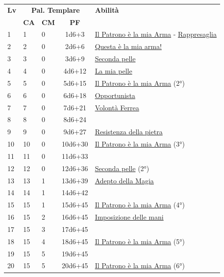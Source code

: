 {\begin{multicols}{2}


\noindent\begin{tabularx}{\linewidth}{p{0.3cm}|p{0.3cm}p{0.3cm}c|X|}
	\toprule
 \rowcolor{gray!20}	\textbf{Lv} & \multicolumn{3}{c|}{\textbf{Pal. Templare}} & \textbf{Abilità} \\
& \centering\arraybackslash \textbf{CA} & \centering\arraybackslash \textbf{CM} & \centering\arraybackslash \textbf{PF} & \\
	\toprule
	1 &1	& 0	&	1d6+3	&\hyperlink{Il Patrono è la mia Arma}{Il Patrono è la mia Arma} - \hyperlink{Rappresaglia}{Rappresaglia}\\
 \rowcolor{gray!20}2	&	2	& 0	&	2d6+6	&\hyperlink{Questa è la mia arma!}{Questa è la mia arma!}\\
	3	&	3	& 0	&	3d6+9	&\hyperlink{Seconda pelle}{Seconda pelle}\\
 \rowcolor{gray!20}4	&	4	& 0	&	4d6+12	&\hyperlink{La mia pelle}{La mia pelle}\\
	5	&	5	& 0	&	5d6+15	&\hyperlink{Il Patrono è la mia Arma}{Il Patrono è la mia Arma} (2°)\\
 \rowcolor{gray!20}6	&	6	& 0	&	6d6+18	&\hyperlink{Opportunista}{Opportunista}\\
	7	&	7	& 0	&	7d6+21	&\hyperlink{Volontà Ferrea}{Volontà Ferrea}\\
 \rowcolor{gray!20}8	&	8	& 0	&	8d6+24	&\\
	9	&	9	& 0	&	9d6+27	&\hyperlink{Resistenza della pietra}{Resistenza della pietra}\\
 \rowcolor{gray!20}10	&	10	& 0	&	10d6+30	&\hyperlink{Il Patrono è la mia Arma}{Il Patrono è la mia Arma} (3°)\\
	11	&	11	& 0	&	11d6+33	&\\
 \rowcolor{gray!20}12	&	12	& 0	&	12d6+36	&\hyperlink{Seconda pelle}{Seconda pelle} (2°)\\
	13	&	13	& 1	&	13d6+39	&\hyperlink{Adepto della Magia}{Adepto della Magia}\\
 \rowcolor{gray!20}14	&	14	& 1	&	14d6+42	&\\
	15	&	15	& 1	&	15d6+45	&\hyperlink{Il Patrono è la mia Arma}{Il Patrono è la mia Arma} (4°)\\
 \rowcolor{gray!20}16	&	15	& 2	&	16d6+45	&\hyperlink{Imposizione delle mani}{Imposizione delle mani}\\
	17	&	15	& 3	&	17d6+45	&\\
 \rowcolor{gray!20}18	&	15	& 4	&	18d6+45	&\hyperlink{Il Patrono è la mia Arma}{Il Patrono è la mia Arma} (5°)\\
	19	&	15	& 5	&	19d6+45	&\\
 \rowcolor{gray!20}20	&	15	& 5	&	20d6+45	&\hyperlink{Il Patrono è la mia Arma}{Il Patrono è la mia Arma} (6°)\\
\end{tabularx}



\end{multicols}}
